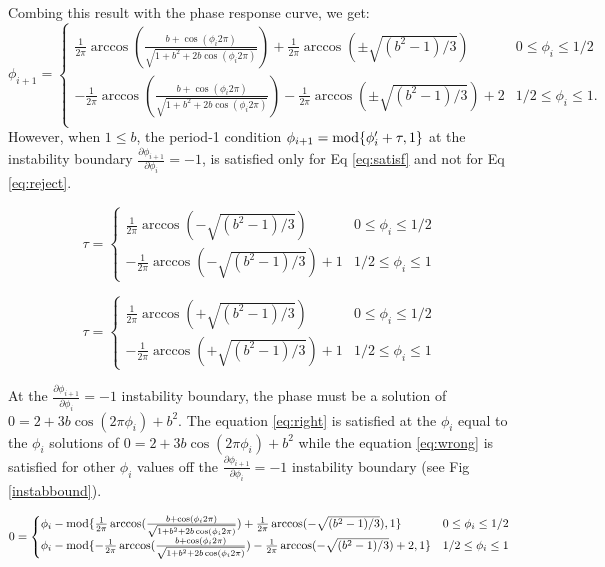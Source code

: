 \noindent Combing this result with the phase response curve, we get:
\begin{equation} \phi_{i+1} =
\begin{cases}
        \frac{1}{2\pi}\arccos(\frac{b+\cos(\phi_i 2\pi)}{\sqrt{1+b^2+2b\cos(\phi_i 2\pi)}}) + \frac{1}{2\pi}\arccos(\pm\sqrt{(b^2 - 1)/3}) & 0 \leq \phi_i \leq 1/2 \\
       -\frac{1}{2\pi}\arccos(\frac{b+\cos(\phi_i 2\pi)}{\sqrt{1+b^2+2b\cos(\phi_i 2\pi)}}) -\frac{1}{2\pi}\arccos(\pm\sqrt{(b^2 - 1)/3}) + 2& 1/2 \leq \phi_i \leq 1. \\
    \end{cases}
\end{equation}
However, when $1\leq b$, the period-1 condition $\phi_{i+1} = \textnormal{mod} \{\phi'_i + \tau,1\}$ at the instability boundary $\frac{\partial \phi_{i+1}}{\partial \phi_i} = -1$, is satisfied only for Eq \ref{eq:satisf} and not for Eq \ref{eq:reject}.

\begin{equation} 
    \tau =
    \begin{cases}
        \frac{1}{2\pi}\arccos(-\sqrt{(b^2 - 1)/3}) & 0 \leq \phi_i \leq 1/2 \\
       -\frac{1}{2\pi}\arccos(-\sqrt{(b^2 - 1)/3}) + 1 & 1/2 \leq \phi_i \leq 1
    \end{cases}
    \label{eq:satisf}
\end{equation} 

\begin{equation} 
    \tau =
    \begin{cases}
        \frac{1}{2\pi}\arccos(+\sqrt{(b^2 - 1)/3}) & 0 \leq \phi_i \leq 1/2 \\
       -\frac{1}{2\pi}\arccos(+\sqrt{(b^2 - 1)/3}) + 1 & 1/2 \leq \phi_i \leq 1
    \end{cases}
    \label{eq:reject}
\end{equation} 

At the $\frac{\partial \phi_{i+1}}{\partial \phi_i} = -1$ instability boundary, the phase must be a solution of $0 = 2+3b\cos(2\pi \phi_i) + b^2$. The equation \ref{eq:right} is satisfied at the $\phi_i$ equal to the $\phi_i$ solutions of $0 = 2+3b\cos(2\pi \phi_i) + b^2$ while the equation \ref{eq:wrong} is satisfied for other $\phi_i$ values off the $\frac{\partial \phi_{i+1}}{\partial \phi_i} = -1$ instability boundary (see Fig \ref{instabbound}).

\begin{equation} 
    0 = 
    \begin{cases}
       \phi_i - \textnormal{mod} \{\frac{1}{2\pi}\arccos(\frac{b+\cos(\phi_i 2\pi)}{\sqrt{1+b^2+2b\cos(\phi_i 2\pi)}}) + \frac{1}{2\pi}\arccos(-\sqrt{(b^2 - 1)/3}),1\}& 0 \leq \phi_i \leq 1/2 \\
       \phi_i - \textnormal{mod} \{-\frac{1}{2\pi}\arccos(\frac{b+\cos(\phi_i 2\pi)}{\sqrt{1+b^2+2b\cos(\phi_i 2\pi)}})-\frac{1}{2\pi}\arccos(-\sqrt{(b^2 - 1)/3}) + 2,1\}& 1/2 \leq \phi_i \leq 1 \\
    \end{cases}
    \label{eq:right}
\end{equation} 

